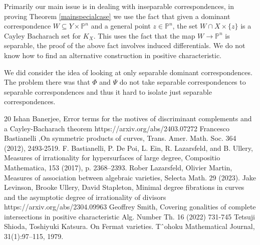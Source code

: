 \documentclass[12pt]{amsart}
\numberwithin{equation}{section}
\numberwithin{theorem}{section}
\theoremstyle{definition}
\theoremstyle{definition}
\def\PP{{\mathbb{P}}}
\begin{document}
Primarily our main issue is in dealing with inseparable correspondences, in proving Theorem \ref{mainspecialcase} we use the fact that given a dominant correspondence $W \subseteq Y \times \PP^n$ and a general point $z \in \PP^n$, the set $W \cap X \times \{z\}$ is a Cayley Bacharach set for $K_X$. This uses the fact that the map $W \to \PP^n$ is separable, the proof of the above fact involves induced differentials. We do not know how to find an alternative construction in positive characteristic. 

We did consider the idea of looking at only separable dominant correspondences. The problem there was that $\Phi$ and $\Psi$ do not take separable correspondences to separable correspondences and thus it hard to isolate just separable correspondences.


\begin{thebibliography}{20}
    Ishan Banerjee, Error terms for the motives of discriminant complements and a Cayley-Bacharach theorem https://arxiv.org/abs/2403.07272
    Francesco Bastianelli ,On symmetric products of curves, Trans. Amer. Math. Soc. 364 (2012), 2493-2519.
    F. Bastianelli, P. De Poi, L. Ein, R. Lazarsfeld, and B. Ullery, Measures of irrationality for hypersurfaces
of large degree, Compositio Mathematica, 153 (2017), p. 2368–2393.
    Rober Lazarsfeld, Olivier Martin, Measures of association between algebraic varieties,  Selecta Math. 29 (2023).
    Jake Levinson, Brooke Ullery, David Stapleton,
    Minimal degree fibrations in curves and the asymptotic degree of irrationality of divisors
    https://arxiv.org/abs/2304.09963
    Geoffrey Smith,
    Covering gonalities of complete intersections in positive characteristic
    Alg. Number Th. 16 (2022) 731-745
    Tetsuji Shioda, Toshiyuki Katsura. On Fermat varieties. Tˆohoku Mathematical Journal,
31(1):97–115, 1979.
\end{thebibliography}
\end{document}
